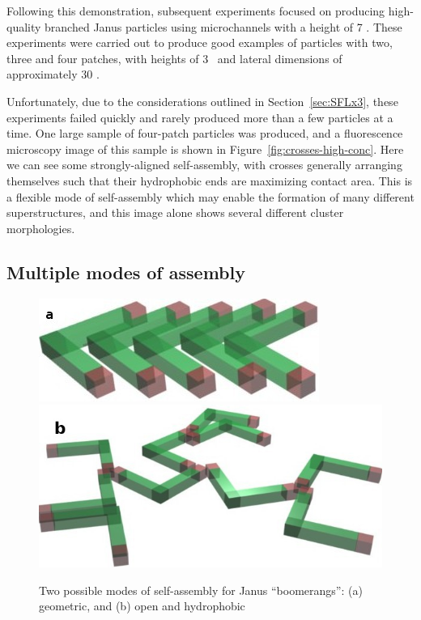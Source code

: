 Following this demonstration, subsequent experiments focused on producing high-quality 
branched Janus particles using microchannels with a height of 7 \microns.  These experiments were carried
out to produce good examples of particles with two, three and four patches, with heights of
3 \microns~and lateral dimensions of approximately 30 \microns.  

Unfortunately, due to the considerations
outlined in Section~\ref{sec:SFLx3}, these experiments failed quickly and rarely produced more than a few
particles at a time.  One large sample of four-patch particles was produced, and a fluorescence 
microscopy image of this sample is shown in Figure~\ref{fig:crosses-high-conc}.  Here we can see 
some strongly-aligned self-assembly, with crosses generally arranging themselves such that
their hydrophobic ends are maximizing contact area.  This is a flexible mode of self-assembly 
which may enable the formation of many different superstructures, and this image alone shows several different
cluster morphologies.

\subsection{Multiple modes of assembly}

\begin{figure}[h]
\begin{center}
\includegraphics[width=0.4\linewidth]{figures/complex-shapes/boomerangs-dense-assembly.jpg} \hfill \includegraphics[width=0.4\linewidth]{figures/complex-shapes/boomerangs-open-assembly.jpg}
\end{center}
\caption{Two possible modes of self-assembly for Janus ``boomerangs'': (a) geometric, and (b) open and hydrophobic}
\label{fig:boomerang-assembly}
\end{figure}


